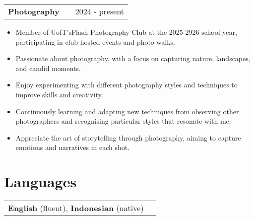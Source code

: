 \documentclass[a4paper,10pt]{article} %
\makeatletter
\newenvironment{joblong}[2]
    {
    \begin{tabularx}{\linewidth}{@{}l X r@{}}
    \textbf{#1} & \hfill &  #2 \\[3.75pt]
    \end{tabularx}
    \begin{minipage}[t]{\linewidth}
    \begin{itemize}[nosep,after=\strut, leftmargin=1em, itemsep=3pt,label=--]
    }
    {
    \end{itemize}
    \end{minipage}    
    }
\makeatother
\begin{document}
\begin{joblong}{Photography}{2024 - present}
\item Member of UofT'sFlash Photography Club at the 2025-2926 school year, participating in club-hosted events and photo walks.
\item Passionate about photography, with a focus on capturing nature, landscapes, and candid moments.
\item Enjoy experimenting with different photography styles and techniques to improve skills and creativity.
\item Continuously learning and adapting new techniques from observing other photographers and recognising particular styles that resonate with me.
\item Appreciate the art of storytelling through photography, aiming to capture emotions and narratives in each shot.
\end{joblong}

\section{Languages}

\begin{tabularx}{\linewidth}{ @{}l r@{} }
\textbf{English} (fluent), \textbf{Indonesian} (native)
\end{tabularx}

\vfill
{}
\end{document}
